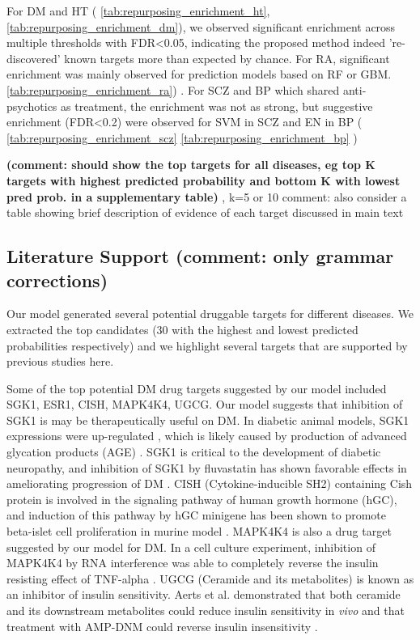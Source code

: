      For DM and HT ( \ref{tab:repurposing_enrichment_ht}, \ref{tab:repurposing_enrichment_dm}), we observed significant enrichment across multiple thresholds with FDR<0.05, indicating the proposed method indeed 're-discovered' known targets more than expected by chance. For RA, significant enrichment was mainly observed for prediction models based on RF or GBM. \ref{tab:repurposing_enrichment_ra}) . For SCZ and BP which shared anti-psychotics as treatment, the enrichment was   not as strong, but suggestive enrichment (FDR<0.2) were observed for SVM in SCZ and EN in BP ( \ref{tab:repurposing_enrichment_scz}  \ref{tab:repurposing_enrichment_bp} )
     
\textbf{(comment: should show the top targets for all diseases, eg top K targets with highest predicted probability and bottom K with lowest pred prob. in a supplementary table)} , k=5 or 10
comment: also consider a table showing brief description of evidence of each target discussed in main text 


  \subsection{Literature Support (comment: only grammar corrections)}
    Our model generated several potential druggable targets for different diseases. We extracted the top candidates (30 with the highest and lowest predicted probabilities respectively) and we highlight several targets that are supported by previous studies here. 

    Some of the top potential DM drug targets  suggested by our model  included SGK1, ESR1, CISH, MAPK4K4, UGCG. Our model suggests that inhibition of  SGK1 is may be therapeutically useful on DM. In diabetic animal models, SGK1 expressions were up-regulated \cite{hills2006high, xuebin2005expression,chang2007enhancement}, which is likely caused by production of advanced glycation products (AGE) \cite{hills2006high,chang2007enhancement}. SGK1 is critical to the development of diabetic neuropathy, and inhibition of SGK1 by fluvastatin has shown favorable effects in ameliorating progression of DM \cite{xuebin2005expression}.  CISH (Cytokine-inducible SH2) containing Cish protein is involved in the signaling pathway of  human growth hormone (hGC), and induction of this pathway by hGC minigene has been shown to promote beta-islet cell proliferation in murine model \cite{baan2015transgenic}. MAPK4K4 is also a drug target suggested by our model for DM. In a cell culture experiment, inhibition of MAPK4K4 by RNA interference was able to completely reverse the insulin resisting effect of TNF-alpha \cite{bouzakri2007map4k4}. UGCG (Ceramide and its metabolites) is known as an inhibitor of insulin sensitivity. Aerts et al. demonstrated that both ceramide and its downstream metabolites could reduce insulin sensitivity in\textit{ vivo} and that treatment with AMP-DNM could reverse insulin insensitivity \cite{aerts2007pharmacological}. 
  
